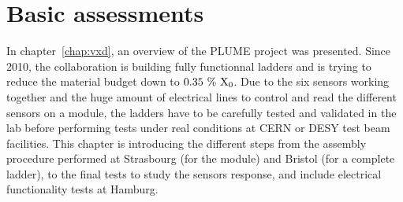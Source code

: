 \chapter{Basic assessments}
\label{chap:labTests}

  In chapter~\ref{chap:vxd}, an overview of the \gls{PLUME} project was presented.
  Since 2010, the collaboration is building fully functionnal ladders and is trying to reduce the material budget down to $0.35~\%~\rm{X_{0}}$.
  Due to the six sensors working together and the huge amount of electrical lines to control and read the different sensors on a module, the ladders have to be carefully tested and validated in the lab before performing tests under real conditions at CERN or DESY test beam facilities.
  This chapter is introducing the different steps from the assembly procedure performed at Strasbourg (for the module) and Bristol (for a complete ladder), to the final tests to study the sensors response, and include electrical functionality tests at Hamburg.



